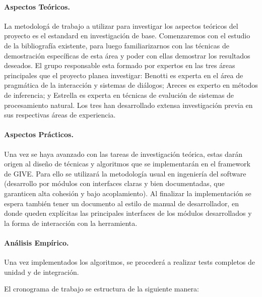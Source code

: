 \paragraph{Aspectos Te\'oricos.}
La metodolog\'a de trabajo a utilizar para investigar los aspectos
te\'oricos del proyecto es el estandard en investigaci\'on de base.
Comenzaremos con el estudio de la bibliograf\'ia existente, para luego
familiarizarnos con las t\'ecnicas de demostraci\'on espec\'ificas de esta
\'area y poder con ellas demostrar los resultados deseados. El grupo
responsable esta formado por expertos en las tres \'areas principales
que el proyecto planea investigar: Benotti es experta en el \'area de
pragm\'atica de la interacci\'on y sistemas de di\'alogos; Areces es
experto en m\'etodos de inferencia; y Estrella es experta en t\'ecnicas
de evaluci\'on de sistemas de procesamiento natural.
Los tres han desarrollado extensa investigaci\'on previa en sus respectivas
\'areas
de experiencia.

\paragraph{Aspectos Pr\'acticos.}
Una vez se haya avanzado con las tareas de investigaci\'on te\'orica,
estas dar\'an origen al dise\~no de t\'ecnicas y algoritmos que se
implementar\'an en el framework de GIVE. Para ello se utilizar\'a la
metodolog\'ia
usual en ingenier\'ia del software (desarrollo por
m\'odulos con interfaces claras y bien documentadas,
que garanticen alta cohesi\'on y bajo acoplamiento).
Al finalizar la implementaci\'on
se espera tambi\'en tener un documento al estilo de manual de
desarrollador, en donde queden expl\'icitas las principales interfaces
de los m\'odulos desarrollados y la forma de interacci\'on con la
herramienta.


\paragraph{An\'alisis Emp\'irico.}
Una vez
implementados los algoritmos, se proceder\'a a realizar tests
completos de unidad y de integraci\'on.



El cronograma de trabajo se estructura de la siguiente manera:

